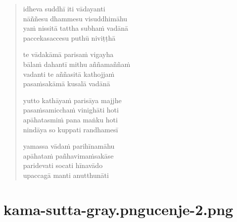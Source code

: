 

\cleartoverso

\vspace*{30mm}

\begin{verse}

idheva suddhī iti vādayanti\\
nāññesu dhammesu visuddhimāhu\\
yaṁ nissitā tattha subhaṁ vadānā\\
paccekasaccesu puthū niviṭṭhā

te vādakāmā parisaṁ vigayha\\
bālaṁ dahantī mithu aññamaññaṁ\\
vadanti te aññasitā kathojjaṁ\\
pasaṁsakāmā kusalā vadānā

yutto kathāyaṁ parisāya majjhe\\
pasaṁsamicchaṁ vinighāti hoti\\
apāhatasmiṁ pana maṅku hoti\\
nindāya so kuppati randhamesī

yamassa vādaṁ parihīnamāhu\\
apāhataṁ pañhavimaṁsakāse\\
paridevati socati hīnavādo\\
upaccagā manti anutthunāti

\end{verse}


\chapter[Pasūra Sutta]{{kama-sutta-gray.png}{ucenje-2.png}}


